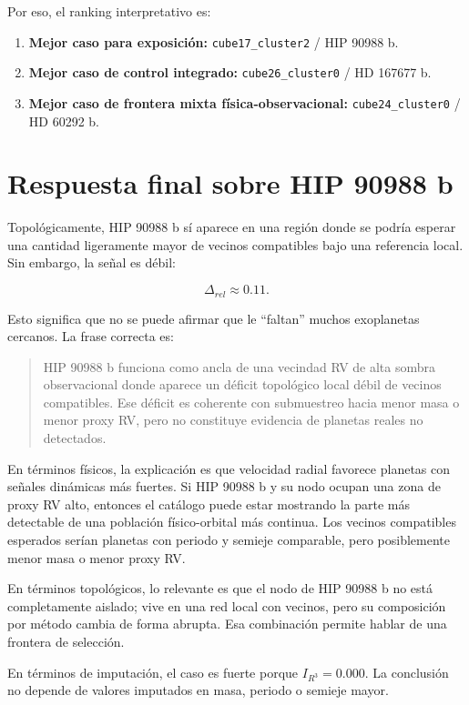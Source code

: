 \documentclass[11pt]{article}
\begin{document}
Por eso, el ranking interpretativo es:

\begin{enumerate}
    \item \textbf{Mejor caso para exposición:} \texttt{cube17\_cluster2} / HIP 90988 b.
    \item \textbf{Mejor caso de control integrado:} \texttt{cube26\_cluster0} / HD 167677 b.
    \item \textbf{Mejor caso de frontera mixta física-observacional:} \texttt{cube24\_cluster0} / HD 60292 b.
\end{enumerate}

\section{Respuesta final sobre HIP 90988 b}

Topológicamente, HIP 90988 b sí aparece en una región donde se podría esperar una cantidad ligeramente mayor de vecinos compatibles bajo una referencia local. Sin embargo, la señal es débil:

\[
\Delta_{rel}\approx 0.11.
\]

Esto significa que no se puede afirmar que le ``faltan'' muchos exoplanetas cercanos. La frase correcta es:

\begin{quote}
HIP 90988 b funciona como ancla de una vecindad RV de alta sombra observacional donde aparece un déficit topológico local débil de vecinos compatibles. Ese déficit es coherente con submuestreo hacia menor masa o menor proxy RV, pero no constituye evidencia de planetas reales no detectados.
\end{quote}

En términos físicos, la explicación es que velocidad radial favorece planetas con señales dinámicas más fuertes. Si HIP 90988 b y su nodo ocupan una zona de proxy RV alto, entonces el catálogo puede estar mostrando la parte más detectable de una población físico-orbital más continua. Los vecinos compatibles esperados serían planetas con periodo y semieje comparable, pero posiblemente menor masa o menor proxy RV.

En términos topológicos, lo relevante es que el nodo de HIP 90988 b no está completamente aislado; vive en una red local con vecinos, pero su composición por método cambia de forma abrupta. Esa combinación permite hablar de una frontera de selección.

En términos de imputación, el caso es fuerte porque $I_{R^3}=0.000$. La conclusión no depende de valores imputados en masa, periodo o semieje mayor.
\end{document}
